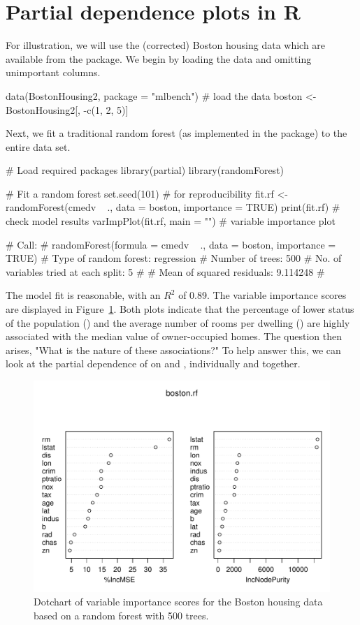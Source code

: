 \section{Partial dependence plots in R}

For illustration, we will use the (corrected) Boston housing data which are available from the  package. We begin by loading the data and omitting unimportant columns.
\begin{example}
data(BostonHousing2, package = "mlbench")  # load the data
boston <- BostonHousing2[, -c(1, 2, 5)]
\end{example}

Next, we fit a traditional random forest (as implemented in the  package) to the entire data set. 
\begin{example}
# Load required packages
library(partial)
library(randomForest)

# Fit a random forest
set.seed(101)  # for reproducibility
fit.rf <- randomForest(cmedv ~ ., data = boston, importance = TRUE)
print(fit.rf)  # check model results
varImpPlot(fit.rf, main = "")  # variable importance plot

# Call:
#   randomForest(formula = cmedv ~ ., data = boston, importance = TRUE) 
# Type of random forest: regression
# Number of trees: 500
# No. of variables tried at each split: 5
# 
# Mean of squared residuals: 9.114248
# %
\end{example}
The model fit is reasonable, with an  $R^2$ of 0.89. The variable importance scores are displayed in Figure~\ref{fig:plotmo_vs_partial}. Both plots indicate that the percentage of lower status of the population () and the average number of rooms per dwelling () are highly associated with the median value of owner-occupied homes. The question then arises, "What is the nature of these associations?" To help answer this, we can look at the partial dependence of  on  and , individually and together. 

\begin{figure}[htbp]
  \centering
  \includegraphics[width=0.8\linewidth]{boston_rf_vimp}
  \caption{Dotchart of variable importance scores for the Boston housing data based on a random forest with 500 trees.}
  \label{fig:plotmo_vs_partial}
\end{figure}

